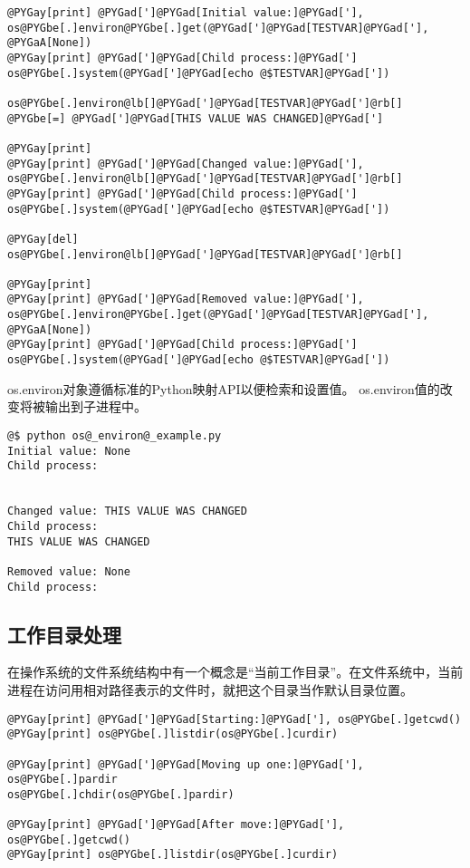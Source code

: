 \documentclass[a4paper,10pt,english]{manual}
\begin{document}
\begin{Verbatim}[commandchars=@\[\]]
@PYGay[print] @PYGad[']@PYGad[Initial value:]@PYGad['], os@PYGbe[.]environ@PYGbe[.]get(@PYGad[']@PYGad[TESTVAR]@PYGad['], @PYGaA[None])
@PYGay[print] @PYGad[']@PYGad[Child process:]@PYGad[']
os@PYGbe[.]system(@PYGad[']@PYGad[echo @$TESTVAR]@PYGad['])

os@PYGbe[.]environ@lb[]@PYGad[']@PYGad[TESTVAR]@PYGad[']@rb[] @PYGbe[=] @PYGad[']@PYGad[THIS VALUE WAS CHANGED]@PYGad[']

@PYGay[print]
@PYGay[print] @PYGad[']@PYGad[Changed value:]@PYGad['], os@PYGbe[.]environ@lb[]@PYGad[']@PYGad[TESTVAR]@PYGad[']@rb[]
@PYGay[print] @PYGad[']@PYGad[Child process:]@PYGad[']
os@PYGbe[.]system(@PYGad[']@PYGad[echo @$TESTVAR]@PYGad['])

@PYGay[del] os@PYGbe[.]environ@lb[]@PYGad[']@PYGad[TESTVAR]@PYGad[']@rb[]

@PYGay[print]
@PYGay[print] @PYGad[']@PYGad[Removed value:]@PYGad['], os@PYGbe[.]environ@PYGbe[.]get(@PYGad[']@PYGad[TESTVAR]@PYGad['], @PYGaA[None])
@PYGay[print] @PYGad[']@PYGad[Child process:]@PYGad[']
os@PYGbe[.]system(@PYGad[']@PYGad[echo @$TESTVAR]@PYGad['])
\end{Verbatim}

os.environ对象遵循标准的Python映射API以便检索和设置值。 os.environ值的改变将被输出到子进程中。

\begin{Verbatim}[commandchars=@\[\]]
@$ python os@_environ@_example.py
Initial value: None
Child process:


Changed value: THIS VALUE WAS CHANGED
Child process:
THIS VALUE WAS CHANGED

Removed value: None
Child process:
\end{Verbatim}


\subsection{工作目录处理}

在操作系统的文件系统结构中有一个概念是“当前工作目录”。在文件系统中，当前进程在访问用相对路径表示的文件时，就把这个目录当作默认目录位置。

\begin{Verbatim}[commandchars=@\[\]]
@PYGay[print] @PYGad[']@PYGad[Starting:]@PYGad['], os@PYGbe[.]getcwd()
@PYGay[print] os@PYGbe[.]listdir(os@PYGbe[.]curdir)

@PYGay[print] @PYGad[']@PYGad[Moving up one:]@PYGad['], os@PYGbe[.]pardir
os@PYGbe[.]chdir(os@PYGbe[.]pardir)

@PYGay[print] @PYGad[']@PYGad[After move:]@PYGad['], os@PYGbe[.]getcwd()
@PYGay[print] os@PYGbe[.]listdir(os@PYGbe[.]curdir)
\end{Verbatim}
\end{document}

